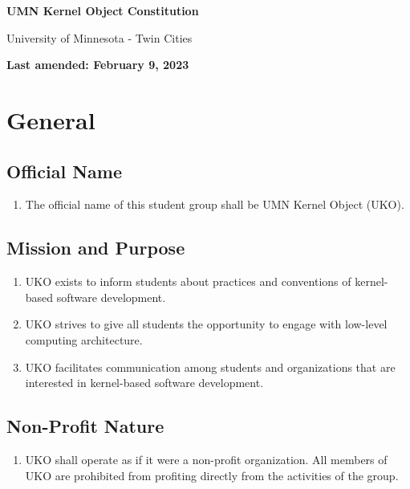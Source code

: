 \documentclass[12pt,executivepaper]{article}
\begin{document}
\begin{center}
    \Large
    \textbf{UMN Kernel Object Constitution}

    \smallskip

    \large
    University of Minnesota - Twin Cities

    \smallskip

    \normalsize
    \textbf{Last amended: February 9, 2023}
\end{center}

\section{General}

\subsection{Official Name}
\begin{enumerate}
    \item The official name of this student group shall be UMN Kernel Object (UKO).
\end{enumerate}

\subsection{Mission and Purpose}
\begin{enumerate}
    \item UKO exists to inform students about practices and conventions of kernel-based
          software development.
    \item UKO strives to give all students the opportunity to engage with low-level computing
          architecture.
    \item UKO facilitates communication among students and organizations that are interested
          in kernel-based software development.
\end{enumerate}

\subsection{Non-Profit Nature}
\begin{enumerate}
    \item UKO shall operate as if it were a non-profit organization. All members
          of UKO are prohibited from profiting directly from the activities of
          the group.
\end{enumerate}
\end{document}

